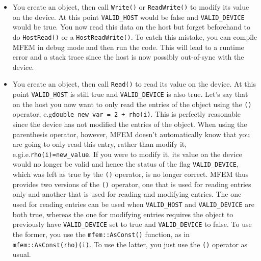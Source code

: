 \documentclass[a4paper,11pt]{article}
\begin{document}
\begin{itemize}
    \item You create an object, then call \texttt{Write()} or \texttt{ReadWrite()} to modify its value on the device. At this point \texttt{VALID\_HOST} would be false and \texttt{VALID\_DEVICE} would be true. You now read this data on the host but forget beforehand to do \texttt{HostRead()} or a \texttt{HostReadWrite()}. To catch this mistake, you can compile MFEM in debug mode and then run the code. This will lead to a runtime error and a stack trace since the host is now possibly out-of-sync with the device. 
    
    \item You create an object, then call \texttt{Read()} to read its value on the device. At this point \texttt{VALID\_HOST} is still true and \texttt{VALID\_DEVICE} is also true. Let's say that on the host you now want to only read the entries of the object using the \texttt{()} operator, e.g\@ \texttt{double new\_var = 2 + rho(i)}. This is perfectly reasonable since the device has not modified the entries of the object. When using the parenthesis operator, however, MFEM doesn't automatically know that you are going to only read this entry, rather than modify it, e.g\@ i.e.\@ \texttt{rho(i)=new\_value}. If you were to modify it, its value on the device would no longer be valid and hence the status of the flag \texttt{VALID\_DEVICE}, which was left as true by the \texttt{()} operator, is no longer correct. MFEM thus provides two versions of the \texttt{()} operator, one that is used for reading entries only and another that is used for reading and modifying entries. The one used for reading entries can be used when \texttt{VALID\_HOST} and \texttt{VALID\_DEVICE} are both true, whereas the one for modifying entries requires the object to previously have \texttt{VALID\_DEVICE} set to true and \texttt{VALID\_DEVICE} to false. To use the former, you use the \texttt{mfem::AsConst()} function, as in \texttt{mfem::AsConst(rho)(i)}. To use the latter, you just use the \texttt{()} operator as usual.
\end{itemize}    

\end{document}
